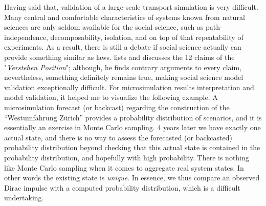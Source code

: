 Having said that, validation of a large-scale transport simulation is very difficult. Many central and comfortable characteristics of systems known from natural sciences are only seldom available for the social science, such as path-independence, decomposability, isolation, and on top of that repeatability of experiments. As a result, there is still a debate if social science actually can provide something similar as laws. \citet[][p.107ff]{Abel_1976} lists and discusses the 12 claims of the "\emph{Verstehen Position}"; although, he finds contrary arguments to every claim, nevertheless, something definitely remains true, making social science model validation exceptionally difficult. For microsimulation results interpretation and model validation, it helped me to visualize the following example. A microsimulation forecast (or backcast) regarding the construction of the ``Westumfahrung Zürich'' provides a probability distribution of scenarios, and it is essentially an exercise in Monte Carlo sampling. 4 years later we have exactly one actual state, and there is no way to assess the forecasted (or backcasted) probability distribution beyond checking that this actual state is contained in the probability distribution, and hopefully with high probability. There is nothing like Monte Carlo sampling when it comes to aggregate real system states. In other words the existing state is \emph{unique}. In essence, we thus compare an observed Dirac impulse with a computed probability distribution, which is a difficult undertaking.

